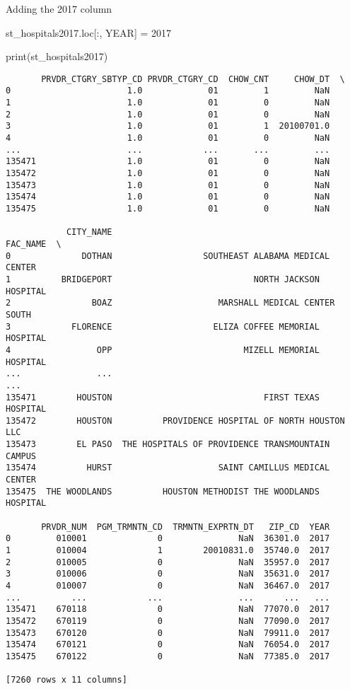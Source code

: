\documentclass[
  letterpaper,
  DIV=11,
  numbers=noendperiod]{scrartcl}
\newenvironment{Shaded}{\begin{snugshade}}{\end{snugshade}}
\newcommand{\BuiltInTok}[1]{\textcolor[rgb]{0.00,0.23,0.31}{#1}}
\newcommand{\DecValTok}[1]{\textcolor[rgb]{0.68,0.00,0.00}{#1}}
\newcommand{\NormalTok}[1]{\textcolor[rgb]{0.00,0.23,0.31}{#1}}
\newcommand{\OperatorTok}[1]{\textcolor[rgb]{0.37,0.37,0.37}{#1}}
\newcommand{\StringTok}[1]{\textcolor[rgb]{0.13,0.47,0.30}{#1}}
\begin{document}
Adding the 2017 column

\begin{Shaded}
\begin{Highlighting}[]
\NormalTok{st\_hospitals2017.loc[:, }\StringTok{\textquotesingle{}YEAR\textquotesingle{}}\NormalTok{] }\OperatorTok{=} \DecValTok{2017}

\BuiltInTok{print}\NormalTok{(st\_hospitals2017)}
\end{Highlighting}
\end{Shaded}

\begin{verbatim}
       PRVDR_CTGRY_SBTYP_CD PRVDR_CTGRY_CD  CHOW_CNT     CHOW_DT  \
0                       1.0             01         1         NaN   
1                       1.0             01         0         NaN   
2                       1.0             01         0         NaN   
3                       1.0             01         1  20100701.0   
4                       1.0             01         0         NaN   
...                     ...            ...       ...         ...   
135471                  1.0             01         0         NaN   
135472                  1.0             01         0         NaN   
135473                  1.0             01         0         NaN   
135474                  1.0             01         0         NaN   
135475                  1.0             01         0         NaN   

            CITY_NAME                                          FAC_NAME  \
0              DOTHAN                  SOUTHEAST ALABAMA MEDICAL CENTER   
1          BRIDGEPORT                            NORTH JACKSON HOSPITAL   
2                BOAZ                     MARSHALL MEDICAL CENTER SOUTH   
3            FLORENCE                    ELIZA COFFEE MEMORIAL HOSPITAL   
4                 OPP                          MIZELL MEMORIAL HOSPITAL   
...               ...                                               ...   
135471        HOUSTON                              FIRST TEXAS HOSPITAL   
135472        HOUSTON          PROVIDENCE HOSPITAL OF NORTH HOUSTON LLC   
135473        EL PASO  THE HOSPITALS OF PROVIDENCE TRANSMOUNTAIN CAMPUS   
135474          HURST                     SAINT CAMILLUS MEDICAL CENTER   
135475  THE WOODLANDS          HOUSTON METHODIST THE WOODLANDS HOSPITAL   

       PRVDR_NUM  PGM_TRMNTN_CD  TRMNTN_EXPRTN_DT   ZIP_CD  YEAR  
0         010001              0               NaN  36301.0  2017  
1         010004              1        20010831.0  35740.0  2017  
2         010005              0               NaN  35957.0  2017  
3         010006              0               NaN  35631.0  2017  
4         010007              0               NaN  36467.0  2017  
...          ...            ...               ...      ...   ...  
135471    670118              0               NaN  77070.0  2017  
135472    670119              0               NaN  77090.0  2017  
135473    670120              0               NaN  79911.0  2017  
135474    670121              0               NaN  76054.0  2017  
135475    670122              0               NaN  77385.0  2017  

[7260 rows x 11 columns]
\end{verbatim}
\end{document}

